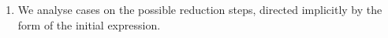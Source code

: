 \documentclass{article}
\begin{document}
\begin{enumerate}
\begin{code}
\\
\>[0]\<[2]%
\>[2] \AgdaSymbol{:}   \AgdaSymbol{\}}            \<%
\\
\>[0]\<[2]%
\>[2] \AgdaSymbol{:}   \AgdaSymbol{\}}              \<%
\end{code}

  \begin{enumerate}[label=\roman*]
  \item
    We analyse cases on the possible reduction steps, directed implicitly by the form of the initial expression.


\end{enumerate}
\end{enumerate}
\end{document}
